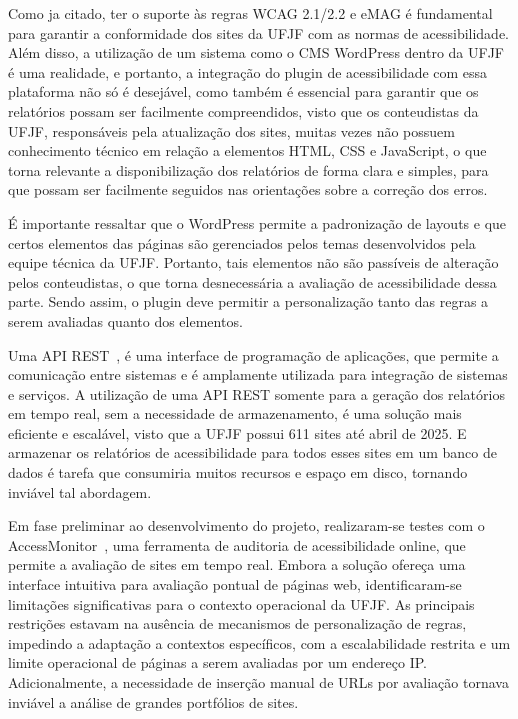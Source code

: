 \documentclass[
    12pt,
    a4paper,
    oneside,
    brazil,
    english
]{article}
\begin{document}
Como ja citado, ter o suporte às regras WCAG 2.1/2.2 e eMAG é fundamental para
garantir a conformidade dos sites da UFJF com as normas de acessibilidade.
Além disso, a utilização de um sistema como o CMS WordPress dentro da UFJF
é uma realidade, e portanto, a integração do plugin de acessibilidade com
essa plataforma não só é desejável, como também é essencial para garantir
que os relatórios possam ser facilmente compreendidos, visto que os
conteudistas da UFJF, responsáveis pela atualização dos sites, muitas
vezes não possuem conhecimento técnico em relação a elementos HTML,
CSS e JavaScript, o que torna relevante a disponibilização dos
relatórios de forma clara e simples, para que possam ser facilmente seguidos nas orientações sobre a
correção dos erros.

É importante ressaltar que o WordPress permite a padronização de layouts
e que certos elementos das páginas são gerenciados pelos temas desenvolvidos pela
equipe técnica da UFJF. Portanto, tais elementos não são passíveis de alteração
pelos conteudistas, o que torna desnecessária a avaliação de acessibilidade dessa parte.
Sendo assim, o plugin deve permitir a
personalização tanto das regras a serem avaliadas quanto dos elementos.

Uma API REST~\cite{api}, é uma interface de programação de aplicações, que
permite a comunicação entre sistemas e é amplamente utilizada para integração
de sistemas e serviços. A utilização de uma API REST somente para a geração
dos relatórios em tempo real, sem a necessidade de armazenamento, é uma
solução mais eficiente e escalável, visto que a UFJF possui
611 sites até abril de 2025. E armazenar os
relatórios de acessibilidade para todos esses sites em um banco de dados é tarefa que consumiria
muitos recursos e espaço em disco, tornando inviável tal abordagem.

Em fase preliminar ao desenvolvimento do projeto, realizaram-se testes com o
AccessMonitor~\cite{AM},
uma ferramenta de auditoria de acessibilidade online, que permite a avaliação de
sites em tempo real. Embora a solução ofereça uma interface intuitiva para
avaliação pontual de páginas web, identificaram-se limitações significativas para o
contexto operacional da UFJF. As principais restrições estavam na ausência de
mecanismos de personalização de regras, impedindo a adaptação a contextos
específicos, com a escalabilidade restrita e um limite operacional de páginas a
serem avaliadas por um endereço IP\@. Adicionalmente, a necessidade de inserção
manual de URLs por avaliação tornava inviável a análise de grandes portfólios de
sites\@.
\end{document}
